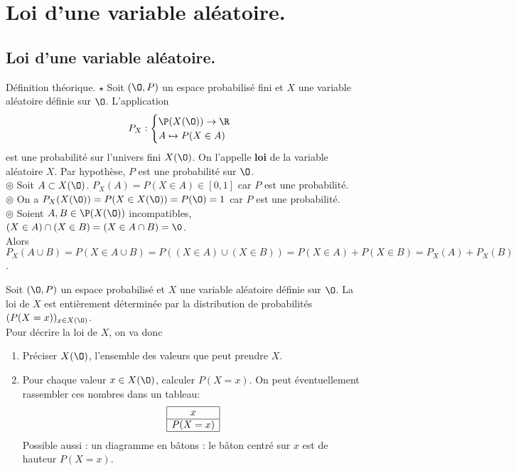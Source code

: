 \documentclass[11pt]{article}
\begin{document}
\section{Loi d'une variable aléatoire.}
\subsection{Loi d'une variable aléatoire.}
\begin{prop}{Définition théorique. $\star$}{}
    Soit $(\O,P)$ un espace probabilisé fini et $X$ une variable aléatoire définie sur $\O$. L'application
    \begin{equation*}
        P_X:\begin{cases}
            \P(X(\O))\to\R\\
            A\mapsto P(X\in A)
        \end{cases}
    \end{equation*}
    est une probabilité sur l'univers fini $X(\O)$. On l'appelle \textbf{loi} de la variable aléatoire $X$.
    \tcblower
    Par hypothèse, $P$ est une probabilité sur $\O$.\\
    $\circledcirc$ Soit $A\subset X(\O)$. $P_X(A)=P(X\in A)\in[0,1]$ car $P$ est une probabilité.\\
    $\circledcirc$ On a $P_X(X(\O))=P(X\in X(\O))=P(\O)=1$ car $P$ est une probabilité.\\
    $\circledcirc$ Soient $A,B\in\P(X(\O))$ incompatibles, $(X\in A)\cap(X\in B)=(X\in A\cap B)=\0$.\\
    Alors $P_X(A\cup B)=P(X\in A\cup B)=P((X\in A)\cup(X\in B))=P(X\in A) + P(X\in B) = P_X(A)+P_X(B)$.
\end{prop}

\begin{meth}{}{}
    Soit $(\O,P)$ un espace probabilisé et $X$ une variable aléatoire définie sur $\O$. La loi de $X$ est entièrement déterminée par la distribution de probabilités $(P(X=x))_{x\in X(\O)}$.\\
    Pour décrire la loi de $X$, on va donc
    \begin{enumerate}[topsep=0pt,itemsep=-0.9 ex]
        \item Préciser $X(\O)$, l'ensemble des valeurs que peut prendre $X$.
        \item Pour chaque valeur $x\in X(\O)$, calculer $P(X=x)$. On peut éventuellement rassembler ces nombres dans un tableau:
        \begin{equation*}
            \begin{array}{|c|}
                \hline
                x\\
                \hline
                P(X=x)\\
                \hline
            \end{array}
        \end{equation*}
        Possible aussi : un diagramme en bâtons : le bâton centré sur $x$ est de hauteur $P(X=x)$.
    \end{enumerate}
\end{meth}
\end{document}
